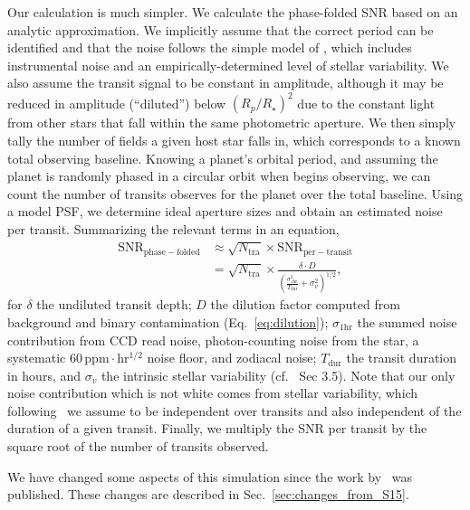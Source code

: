 Our calculation is much simpler. We calculate the phase-folded SNR based on an 
analytic approximation.
We implicitly assume that the correct period can be identified and that the noise follows
the simple model of , which includes instrumental noise
and an empirically-determined level of stellar variability.
We also assume the transit signal to be constant in amplitude, although it may 
be reduced
in amplitude (``diluted'') below $(R_p/R_\star)^2$ due to the constant light 
from other stars
that fall within the same photometric aperture.
We then simply tally the number of \tess fields a
given host star falls in, which corresponds to a known total
observing baseline.  Knowing a planet's orbital period, and assuming the
planet is randomly phased in a circular orbit when \tess begins observing, 
we can count the number of transits \tess observes for the planet over the 
total baseline.
Using a model PSF, we determine ideal aperture sizes and obtain 
an estimated noise per transit.
Summarizing the relevant terms in an equation,
\begin{align}
    \mathrm{SNR}_\mathrm{phase-folded} &\approx
	\sqrt{N_\mathrm{tra}} \times \mathrm{SNR}_\mathrm{per-transit}\nonumber \\
	 &= \sqrt{N_\mathrm{tra}} \times 
	\frac{\delta \cdot D}{\left(\frac{\sigma_\mathrm{1hr}^2}{T_\mathrm{dur}} 
		+ \sigma_v^2 \right)^{1/2}}, 
	\label{eq:snr} 
\end{align}
for $\delta$ the undiluted transit depth; $D$ the dilution factor
computed from background and binary contamination (Eq.~\ref{eq:dilution});
$\sigma_\mathrm{1hr}$ the summed noise contribution from CCD read noise, 
photon-counting noise from the star, a systematic 
$60\,\mathrm{ppm\cdot hr^{1/2}}$ noise floor, and zodiacal noise;
$T_\mathrm{dur}$ the transit duration in hours, and $\sigma_v$ the intrinsic
stellar variability (cf.~ Sec 3.5).
Note that our only noise contribution which is not white comes from stellar 
variability, 
which following~ we assume to be independent over 
transits and also independent of the duration of a given transit.
Finally, we multiply the SNR per transit by the square root of the number of transits
observed.

We have changed some aspects of this simulation
since the work by~ was published. These
changes are described in Sec.~\ref{sec:changes_from_S15}.
